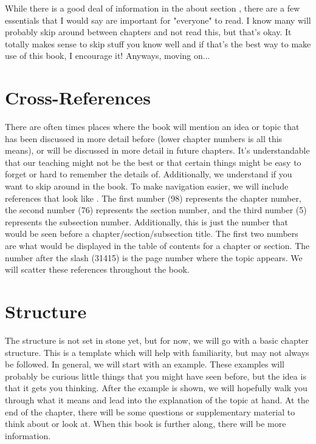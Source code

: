 \documentclass[../OpenAppliedMusicTheory.tex]{subfiles}
\begin{document}
    
    
    While there is a good deal of information in the about section , there are a few essentials that I would say are important for "everyone" to read. I know many will probably skip around between chapters and not read this, but that's okay. It totally makes sense to skip stuff you know well and if that's the best way to make use of this book, I encourage it! Anyways, moving on...
    
    \section{Cross-References}\label{ch0:references}
    There are often times places where the book will mention an idea or topic that has been discussed in more detail before (lower chapter numbers is all this means), or will be discussed in more detail in future chapters. It's understandable that our teaching might not be the best or that certain things might be easy to forget or hard to remember the details of. Additionally, we understand if you want to skip around in the book. To make navigation easier, we will include references that look like . The first number (98) represents the chapter number, the second number (76) represents the section number, and the third number (5) represents the subsection number. Additionally, this is just the number that would be seen before a chapter/section/subsection %
    title. The first two numbers are what would be displayed in the table of contents for a chapter or section. The number after the slash (31415) is the page number where the topic appears. We will scatter these references throughout the book.

    \section{Structure}\label{ch0:structure}
    The structure is not set in stone yet, but for now, we will go with a basic chapter structure. This is a template which will help with familiarity, but may not always be followed. In general, we will start with an example. These examples will probably be curious little things that you might have seen before, but the idea is that it gets you thinking. After the example is shown, we will hopefully walk you through what it means and lead into the explanation of the topic at hand. At the end of the chapter, there will be some questions or supplementary material to think about or look at. When this book is further along, there will be more information. %
\end{document}

